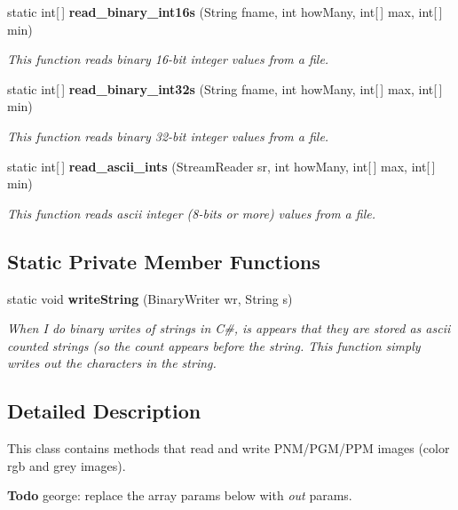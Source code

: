 \begin{CompactItemize}
static int[$\,$] {\bf read\_\-binary\_\-int16s} (String fname, int how\-Many, int[$\,$] max, int[$\,$] min)
\begin{CompactList}\small\item\em This function reads binary 16-bit integer values from a file. \item\end{CompactList}\item 
static int[$\,$] {\bf read\_\-binary\_\-int32s} (String fname, int how\-Many, int[$\,$] max, int[$\,$] min)
\begin{CompactList}\small\item\em This function reads binary 32-bit integer values from a file. \item\end{CompactList}\item 
static int[$\,$] {\bf read\_\-ascii\_\-ints} (Stream\-Reader sr, int how\-Many, int[$\,$] max, int[$\,$] min)
\begin{CompactList}\small\item\em This function reads ascii integer (8-bits or more) values from a file. \item\end{CompactList}\end{CompactItemize}
\subsection*{Static Private Member Functions}
\begin{CompactItemize}
\item 
static void {\bf write\-String} (Binary\-Writer wr, String s)
\begin{CompactList}\small\item\em When I do binary writes of strings in C\#, is appears that they are stored as ascii counted strings (so the count appears before the string. This function simply writes out the characters in the string. \item\end{CompactList}\end{CompactItemize}


\subsection{Detailed Description}
This class contains methods that read and write PNM/PGM/PPM images (color rgb and grey images). 

\begin{Desc}
\item[{\bf Todo}]george: replace the array params below with {\em out\/} params. \end{Desc}




